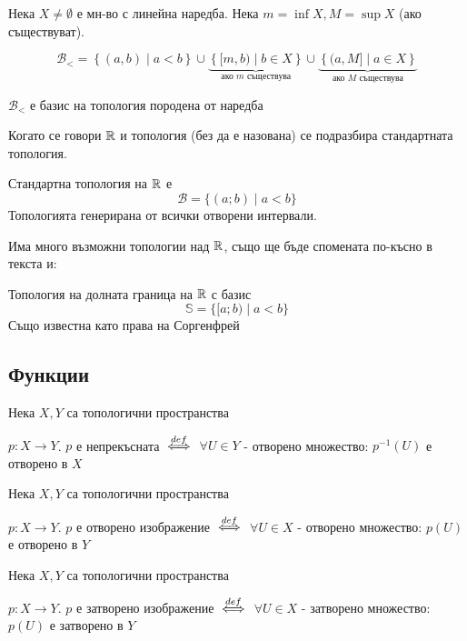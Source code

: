 \begin{definition}
    Нека $X \neq \emptyset$ е мн-во с линейна наредба. Нека $m=\inf X, M=\sup X$ (ако съществуват). 

    \begin{equation*}
        \mathcal B_< = \left\{(a,b) \mid a < b\right\} \cup \underbrace{\left\{ [m, b) \mid b \in X \right\}}_{\text{ако $m$ съществува}} \cup \underbrace{\left\{ (a, M] \mid a \in X \right\}}_{\text{ако $M$ съществува}}
    \end{equation*}
\end{definition}
\begin{notation}
    $\mathcal B_<$ е базис на топология породена от наредба
\end{notation}

Когато се говори ${\mathbb{R}}$ и топология (без да е назована) се подразбира стандартната топология.
\begin{definition}
    Стандартна топология на ${\mathbb{R}}$ е
    \begin{equation*}
        \mathcal B = \{(a;b) \mid a<b\}
    \end{equation*}
    Топологията генерирана от всички отворени интервали.
\end{definition}
Има много възможни топологии над ${\mathbb{R}}$, също ще бъде спомената по-късно в текста и:
\begin{definition}
    Топология на долната граница на ${\mathbb{R}}$ с базис
    \begin{equation*}
       \mathbb S = \{[a; b)\mid a < b\}
    \end{equation*}
    Също известна като права на Соргенфрей
\end{definition}

\subsection{Функции}
\begin{definition}
    Нека $X, Y$ са топологични пространства
    
    $p: X \to Y$. $p$ е непрекъсната ${\overset{def}{\iff}}$ $\forall U \in Y$ - отворено множество: $p^{-1}(U)$ е отворено в $X$ 
\end{definition}
\begin{definition}
    Нека $X, Y$ са топологични пространства
    
    $p: X \to Y$. $p$ е отворено изображение ${\overset{def}{\iff}}$ $\forall U \in X$ - отворено множество: $p(U)$ е отворено в $Y$ 
\end{definition}
\begin{definition}
    Нека $X, Y$ са топологични пространства
    
    $p: X \to Y$. $p$ е затворено изображение ${\overset{def}{\iff}}$ $\forall U \in X$ - затворено множество: $p(U)$ е затворено в $Y$ 
\end{definition}


